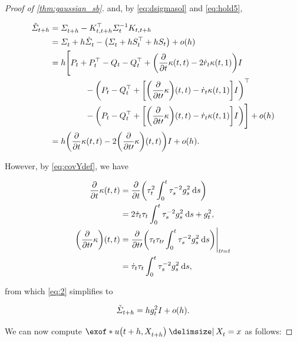 \begin{proof}[Proof of \cref{thm:gaussian_sb}]
and, by \eqref{eq:dsigmasol} and \eqref{eq:hold5},

\begin{align}
\nn
\Sigmac &= \Sigmasol[\ctime+h] - \Kth^\top \Sigmasolinv \Kth \\
\nn
&= \Sigmasol + h\dSigmasol - \parens*{   \Sigmasol + h \St^\top + h\St } + o(h) \\
\nn
&= h \Bigg[  \Pt + \Pt^\top - \Qt - \Qt^\top +  \parens*{  \frac{\del}{\del \ctime} \kernel[\ctime][\ctime] -2 \dratio \kernel[\ctime][\horizon]  }\eye  \\
\nn
&\hspace{15mm}- \parens*{ \Pt - \Qt^\top + \bracks*{\parens*{ \frac{\del}{\del \ctime\prime}\kernelbase }(\ctime, \ctime) - \dratio \kernel[\ctime][\horizon] } \eye  }^\top \\
&\hspace{15mm}- \parens*{ \Pt - \Qt^\top + \bracks*{\parens*{\frac{\del}{\del \ctime\prime}\kernelbase }(\ctime, \ctime) - \dratio \kernel[\ctime][\horizon] } \eye  }  \Bigg] + o(h) \\
\label{eq:2}
&=  h\parens*{\frac{\del}{\del \ctime} \kernel[\ctime][\ctime]- 2 \parens*{\frac{\del}{\del \ctime\prime}\kernelbase }(\ctime, \ctime)}\eye + o(h).
\end{align}

However, by \eqref{eq:covYdef}, we have

\begin{align}
\nn
\frac{\del}{\del \ctime} \kernel[\ctime][\ctime] &= \frac{\del}{\del \ctime} \parens*{  \aggtimesq[\ctime] \intdasq } \\
\nn
&= 2 \daggtime\aggtime\intdasq + \volatsq[\ctime], \\
\parens*{\frac{\del}{\del \ctime\prime}\kernelbase }(\ctime, \ctime) &= \frac{\del}{\del \ctime\prime} \parens*{  \aggtime[\ctime]\aggtime[\ctime\prime] \intdasq }\Bigg\vert_{\ctime\prime = \ctime} \\
&= \daggtime\aggtime\intdasq, 
\end{align} 

from which \eqref{eq:2} simplifies to

\begin{equation}
\label{eq:sigmacapprox}
\Sigmac = h \volatsq[\ctime] \eye + o(h).
\end{equation}

We can now compute $\exof*{ \testf[\ctime+h][\Xsol[\ctime+h]] \given \Xsol = \point  }$ as follows:


\end{proof}
